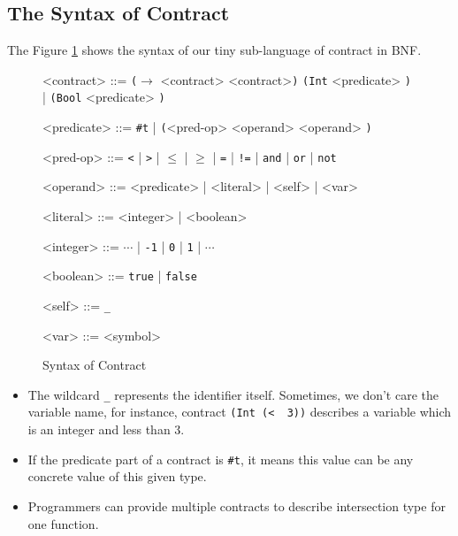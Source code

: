 \documentclass[paper=a4, fontsize=11pt]{scrartcl} %
\numberwithin{equation}{section} %
\numberwithin{figure}{section} %
\numberwithin{table}{section} %
\begin{document}
\subsection{The Syntax of Contract}
The Figure \ref{figc} shows the syntax of our tiny sub-language of contract in BNF.
\begin{figure}[h!]
\setlength{\grammarparsep}{7pt plus 1pt minus 1pt} %
\setlength{\grammarindent}{8em} %
\begin{grammar}
<contract> ::= \texttt{($\rightarrow$} <contract> <contract>\texttt{)}
\alt \texttt{(Int} <predicate> \texttt{)} | \texttt{(Bool} <predicate> \texttt{)}

<predicate> ::= \texttt{\#t} | \texttt{(}<pred-op> <operand> <operand> \texttt{)}

<pred-op> ::= \texttt{\textless} | \texttt{\textgreater} | \texttt{$\leq$} | \texttt{$\geq$} | \texttt{=} | \texttt{!=} | \texttt{and} | \texttt{or} | \texttt{not}

<operand> ::= <predicate> | <literal> | <self> | <var>

<literal> ::= <integer> | <boolean>

<integer> ::= $\cdots$ | \texttt{-1} | \texttt{0} | \texttt{1} | $\cdots$

<boolean> ::= \texttt{true} | \texttt{false}

<self> ::= \texttt{_}

<var> ::= <symbol>
\end{grammar}
\caption{Syntax of Contract}
\label{figc}
\end{figure}

\begin{itemize}
\item The wildcard \texttt{_} represents the identifier itself. Sometimes, we don't care the variable name, for instance, contract \texttt{(Int\ (\textless\ \underscore\ 3))} describes a variable which is an integer and less than 3.

\item If the predicate part of a contract is \texttt{\#t}, it means this value can be any concrete value of this given type.

\item Programmers can provide multiple contracts to describe intersection type for one function.
\end{itemize}
\end{document}
